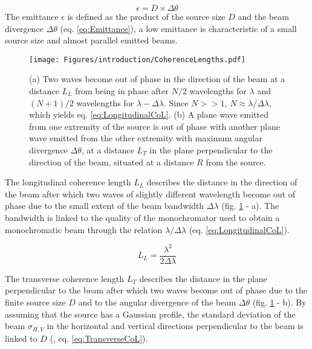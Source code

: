 \begin{equation}
    \label{eq:Emittance}
    \epsilon = D \times \Delta\theta
\end{equation}
The emittance $\epsilon$ is defined as the product of the source size $D$ and the beam divergence $\Delta\theta$ (eq. \ref{eq:Emittance}), a low emittance is characteristic of a small source size and almost parallel emitted beams.

\begin{figure}[!htb]
    \centering
    \texttt{[image: Figures/introduction/CoherenceLengths.pdf]}
    \caption{
    (a) Two waves become out of phase in the direction of the beam at a distance $L_L$ from being in phase after $N/2$ wavelengths for $\lambda$ and $(N+1)/2$ wavelengths for $\lambda - \Delta\lambda$. Since $N >> 1$, $N\approx\lambda/\Delta\lambda$, which yields eq. \ref{eq:LongitudinalCoL}.
    (b) A plane wave emitted from one extremity of the source is out of phase with another plane wave emitted from the other extremity with maximum angular divergence $\Delta\theta$, at a distance $L_T$ in the plane perpendicular to the direction of the beam, situated at a distance $R$ from the source.
    }
    \label{fig:CoherenceLengths}
\end{figure}

The longitudinal coherence length $L_L$ describes the distance in the direction of the beam after which two waves of slightly different wavelength become out of phase due to the small extent of the beam bandwidth $\Delta\lambda$ (fig. \ref{fig:CoherenceLengths} - a).
The bandwidth is linked to the quality of the monochromator used to obtain a monochromatic beam through the relation $\lambda/\Delta\lambda$ (eq. \ref{eq:LongitudinalCoL}).

\begin{equation}
    \label{eq:LongitudinalCoL}
    L_L = \frac{\lambda^2}{2\Delta\lambda}
\end{equation}

The transverse coherence length $L_T$ describes the distance in the plane perpendicular to the beam after which two waves become out of phase due to the finite source size $D$ and to the angular divergence of the beam $\Delta\theta$ (fig. \ref{fig:CoherenceLengths} - b).
By assuming that the source has a Gaussian profile, the standard deviation of the beam $\sigma_{H, V}$ in the horizontal and vertical directions perpendicular to the beam is linked to $D$ (\cite{Willmott}, eq. \ref{eq:TransverseCoL}).

